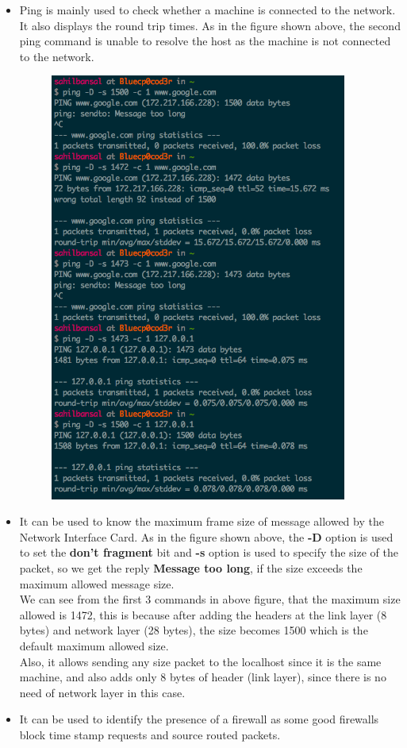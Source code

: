 \documentclass[]{report}
\begin{document}
\begin{itemize}
	\item Ping is mainly used to check whether a machine is connected to the network. It also displays the round trip times. As in the figure shown above, the second ping command is unable to resolve the host as the machine is not connected to the network.
	\begin{figure}[H]
		\vspace{0pt}
		\includegraphics[height = 400pt, keepaspectratio]{Snapshots/exe7/q7_2.png}
	\end{figure} 
	\item It can be used to know the maximum frame size of message allowed by the Network Interface Card. As in the figure shown above, the \textbf{-D} option is used to set the \textbf{don't fragment} bit and \textbf{-s} option is used to specify the size of the packet, so we get the reply \textbf{Message too long}, if the size exceeds the maximum allowed message size. 
	\\
	We can see from the first 3 commands in above figure, that the maximum size allowed is 1472, this is because after adding the headers at the link layer (8 bytes) and network layer (28 bytes), the size becomes 1500 which is the default maximum allowed size. 
	\\
	Also, it allows sending any size packet to the localhost since it is the same machine, and also adds only 8 bytes of header (link layer), since there is no need of network layer in this case. 
	\item It can be used to identify the presence of a firewall as some good firewalls block time stamp requests and source routed packets. 
\end{itemize}
\end{document}
